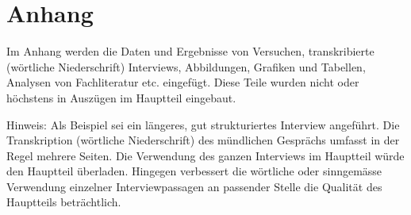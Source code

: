 \part{Anhang}
Im Anhang werden die Daten und Ergebnisse von Versuchen, transkribierte (wörtliche Niederschrift) Interviews, Abbildungen, 
Grafiken und Tabellen, Analysen von Fachliteratur etc. eingefügt. Diese Teile wurden nicht oder höchstens in Auszügen im Hauptteil eingebaut.

Hinweis:
Als Beispiel sei ein längeres, gut strukturiertes Interview angeführt. Die Transkription (wörtliche Niederschrift) des 
mündlichen Gesprächs umfasst in der Regel mehrere Seiten. Die Verwendung des ganzen Interviews im Hauptteil würde den Hauptteil 
überladen. Hingegen verbessert die wörtliche oder sinngemässe Verwendung einzelner Interviewpassagen an passender Stelle die
 Qualität des Hauptteils beträchtlich.
   